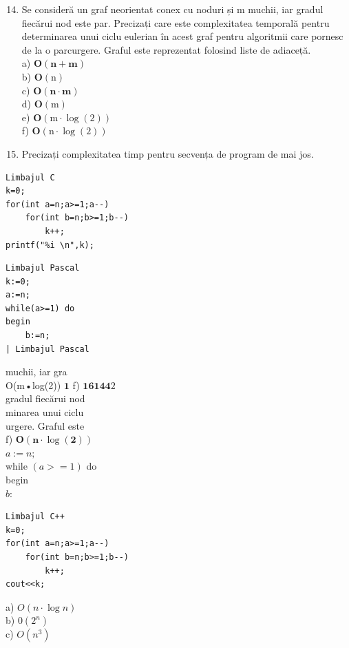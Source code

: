 \documentclass[10pt]{article}
\begin{document}
\begin{enumerate}
  \setcounter{enumi}{13}
  \item Se consideră un graf neorientat conex cu noduri și m muchii, iar gradul fiecărui nod este par. Precizați care este complexitatea temporală pentru determinarea unui ciclu eulerian în acest graf pentru algoritmii care pornesc de la o parcurgere. Graful este reprezentat folosind liste de adiaceță.\\
a) $\mathbf{O}(\mathbf{n}+\mathbf{m})$\\
b) $\mathbf{O}(\mathrm{n})$\\
c) $\mathbf{O}(\mathbf{n} \cdot \mathbf{m})$\\
d) $\mathbf{O}(\mathrm{m})$\\
e) $\mathbf{O}(\mathrm{m} \cdot \log (2))$\\
f) $\mathbf{O}(\mathrm{n} \cdot \log (2))$
  \item Precizați complexitatea timp pentru secvența de program de mai jos.
\end{enumerate}

\begin{verbatim}
Limbajul C
k=0;
for(int a=n;a>=1;a--)
    for(int b=n;b>=1;b--)
        k++;
printf("%i \n",k);
\end{verbatim}

\begin{verbatim}
Limbajul Pascal
k:=0;
a:=n;
while(a>=1) do
begin
    b:=n;
| Limbajul Pascal
\end{verbatim}

muchii, iar gra\\
O(m•log(2)) $\mathbf{1}$ f) $\mathbf{1 6 1 4 4} 2$\\
gradul fiecărui nod\\
minarea unui ciclu\\
urgere. Graful este\\
f) $\mathbf{O}(\mathbf{n} \cdot \log (\mathbf{2}))$\\
$a:=n ;$\\
while $(a>=1)$ do\\
begin\\
$b:$

\begin{verbatim}
Limbajul C++
k=0;
for(int a=n;a>=1;a--)
    for(int b=n;b>=1;b--)
        k++;
cout<<k;
\end{verbatim}

a) $O(n \cdot \log n)$\\
b) $0\left(2^{n}\right)$\\
c) $O\left(n^{3}\right)$
\end{document}
